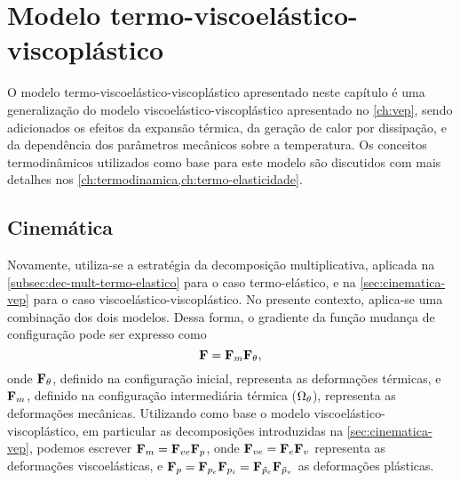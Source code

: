 \documentclass[Tese.tex]{subfiles}
\begin{document}
	
\chapter{Modelo termo-viscoelástico-viscoplástico} \label{ch:tvep}

O modelo termo-viscoelástico-viscoplástico apresentado neste capítulo é uma generalização do modelo viscoelástico-viscoplástico apresentado no \autoref{ch:vep}, sendo adicionados os efeitos da expansão térmica, da geração de calor por dissipação, e da dependência dos parâmetros mecânicos sobre a temperatura. Os conceitos termodinâmicos utilizados como base para este modelo são discutidos com mais detalhes nos \cref{ch:termodinamica,ch:termo-elasticidade}.

\section{Cinemática}\label{sec:cinematica-tvevp}

Novamente, utiliza-se a estratégia da decomposição multiplicativa, aplicada na \autoref{subsec:dec-mult-termo-elastico} para o caso termo-elástico, e na \autoref{sec:cinematica-vep} para o caso viscoelástico-viscoplástico. No presente contexto, aplica-se uma combinação dos dois modelos. Dessa forma, o gradiente da função mudança de configuração pode ser expresso como
\begin{equation}
	\mathbf{F} = \mathbf{F}_m\mathbf{F}_{\theta}, \label{eq:dec-mult-tvep}
\end{equation}
onde $\mathbf{F}_{\theta}$, definido na configuração inicial, representa as deformações térmicas, e $\mathbf{F}_m$, definido na configuração intermediária térmica ($\Omega_{\theta}$), representa as deformações mecânicas. Utilizando como base o modelo viscoelástico-viscoplástico, em particular as decomposições introduzidas na \autoref{sec:cinematica-vep}, podemos escrever $\mathbf{F}_m = \mathbf{F}_{ve}\mathbf{F}_p$, onde $\mathbf{F}_{ve} = \mathbf{F}_e\mathbf{F}_v$ representa as deformações viscoelásticas, e $\mathbf{F}_p = \mathbf{F}_{p_e}\mathbf{F}_{p_i} = \mathbf{F}_{\tilde{p}_e}\mathbf{F}_{\tilde{p}_v}$ as deformações plásticas.
\end{document}
